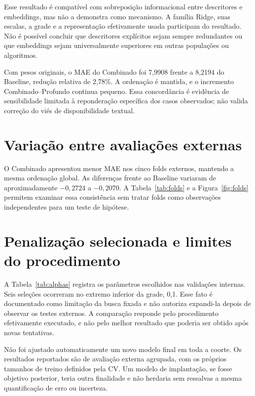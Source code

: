

Esse resultado é compatível com sobreposição informacional entre descritores e embeddings, mas não a demonstra como mecanismo. A família Ridge, suas escalas, a grade e a representação efetivamente usada participam do resultado. Não é possível concluir que descritores explícitos sejam sempre redundantes ou que embeddings sejam universalmente superiores em outras populações ou algoritmos.

Com pesos originais, o MAE do Combinado foi 7,9908 frente a 8,2194 do Baseline, redução relativa de 2,78\%. A ordenação é mantida, e o incremento Combinado--Profundo continua pequeno. Essa concordância é evidência de sensibilidade limitada à reponderação específica dos casos observados; não valida correção do viés de disponibilidade textual.

\section{Variação entre avaliações externas}
O Combinado apresentou menor MAE nos cinco folds externos, mantendo a mesma ordenação global. As diferenças frente ao Baseline variaram de aproximadamente $-0{,}2724$ a $-0{,}2070$. A Tabela~\ref{tab:folds} e a Figura~\ref{fig:folds} permitem examinar essa consistência sem tratar folds como observações independentes para um teste de hipótese.


\FloatBarrier

\section{Penalização selecionada e limites do procedimento}
A Tabela~\ref{tab:alphas} registra os parâmetros escolhidos nas validações internas. Seis seleções ocorreram no extremo inferior da grade, 0,1. Esse fato é documentado como limitação da busca fixada e não autoriza expandi-la depois de observar os testes externos. A comparação responde pelo procedimento efetivamente executado, e não pelo melhor resultado que poderia ser obtido após novas tentativas.



Não foi ajustado automaticamente um novo modelo final em toda a coorte. Os resultados reportados são de avaliação externa agrupada, com os próprios tamanhos de treino definidos pela CV. Um modelo de implantação, se fosse objetivo posterior, teria outra finalidade e não herdaria sem ressalvas a mesma quantificação de erro ou incerteza.
